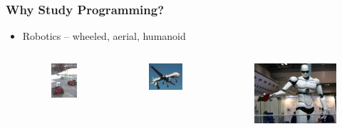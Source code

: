 \documentclass{beamer}
\begin{document}
\begin{frame}
    \frametitle{Why Study Programming?}
    \begin{itemize}
        \item Robotics -- wheeled, aerial, humanoid
        \begin{columns}
            \begin{figure}
                \centering
                \includegraphics[scale=0.45]{wheeled}
            \end{figure}
            \begin{figure}
                \centering
                \includegraphics[scale=0.45]{aerial}
            \end{figure}
            \begin{figure}
                \centering
                \includegraphics[scale=0.22]{humanoid}
            \end{figure}
        \end{columns}
    \end{itemize}
\end{frame}
\end{document}
